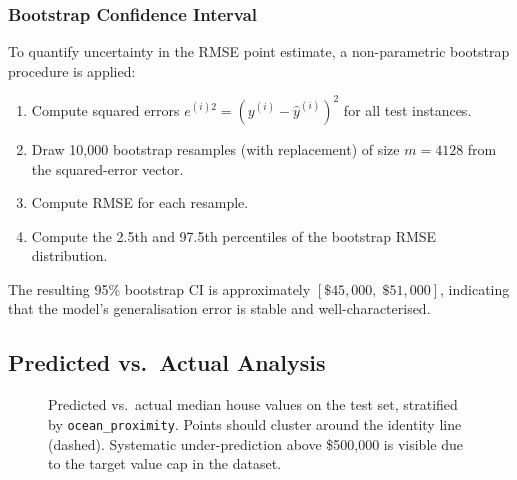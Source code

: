 \documentclass[conference]{IEEEtran}
\begin{document}
\subsubsection{Bootstrap Confidence Interval}

To quantify uncertainty in the RMSE point estimate, a non-parametric bootstrap procedure is applied:
\begin{enumerate}
    \item Compute squared errors $e^{(i)2} = (y^{(i)} - \hat{y}^{(i)})^2$ for all test instances.
    \item Draw 10,000 bootstrap resamples (with replacement) of size $m = 4128$ from the squared-error vector.
    \item Compute RMSE for each resample.
    \item Compute the 2.5th and 97.5th percentiles of the bootstrap RMSE distribution.
\end{enumerate}

The resulting 95\% bootstrap CI is approximately $[\$45{,}000,\; \$51{,}000]$, indicating that the model's generalisation error is stable and well-characterised.

\subsection{Predicted vs.\ Actual Analysis}

\begin{figure}[H]
    \centering
    \caption{Predicted vs.\ actual median house values on the test set, stratified by \texttt{ocean\_proximity}. Points should cluster around the identity line (dashed). Systematic under-prediction above \$500,000 is visible due to the target value cap in the dataset.}
    \label{fig:pred_actual}
\end{figure}
\end{document}
